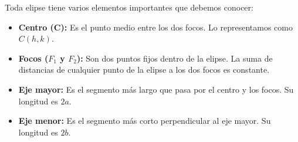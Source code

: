 \documentclass[12pt,a4paper]{article}
\begin{document}
	\noindent
	\begin{minipage}[t]{0.52\textwidth}
	Toda elipse tiene varios elementos importantes que debemos conocer:

	\begin{itemize}
		\item \textbf{Centro (C):} Es el punto medio entre los dos focos. Lo representamos como $C(h,k)$.

		\item \textbf{Focos ($F_1$ y $F_2$):} Son dos puntos fijos dentro de la elipse. La suma de distancias de cualquier punto de la elipse a los dos focos es constante.

		\item \textbf{Eje mayor:} Es el segmento más largo que pasa por el centro y los focos. Su longitud es $2a$.

		\item \textbf{Eje menor:} Es el segmento más corto perpendicular al eje mayor. Su longitud es $2b$.

	\end{itemize}
	\end{minipage}%
	\hfill
\end{document}

